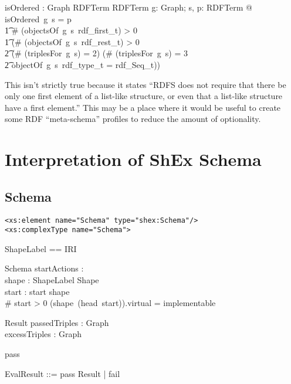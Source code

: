 \documentclass{article}
\begin{document}
\begin{gendef}
   isOrdered : Graph \pfun RDFTerm \pfun RDFTerm
\where
   \forall g: Graph; s, p: RDFTerm @ isOrdered~g~s = p \iff \\
\t1 \# (objectsOf~g~s~rdf\_first\_t) > 0 \land \\
\t1 (\# (objectsOf~g~s~rdf\_rest\_t) > 0 \land \\
\t2 (\# (triplesFor~g~s) = 2) \lor (\# (triplesFor~g~s) = 3 \land \\
\t2 objectOf~g~s~rdf\_type\_t = rdf\_Seq\_t))
\end{gendef}

This isn't strictly true because it states ``RDFS does not require
that there be only one first element of a list-like structure, or even
that a list-like structure have a first element.''\cite{rdfschema}
This may be a place where it would be useful to create some RDF
``meta-schema'' profiles to reduce the amount of optionality.

\section{Interpretation of ShEx Schema}
\subsection{Schema}
\verb|<xs:element name="Schema" type="shex:Schema"/>| \\
\verb|<xs:complexType name="Schema">|

\begin{zed}
ShapeLabel == IRI
\end{zed}

\begin{schema}{Schema}
   startActions : \optional[SemanticActions] \\
   shape : ShapeLabel \pfun Shape \\
   start : \optional[ShapeLabel]
\where
   \ran start \subseteq \dom shape \\
   \# start > 0 \implies (shape~(head~start)).virtual = implementable
\end{schema}

\begin{schema}{Result}
   passedTriples : Graph \\
   excessTriples : Graph
\end{schema}{pass}


\begin{zed}
EvalResult ::= pass \ldata Result \rdata | fail
\end{zed}
\end{document}
